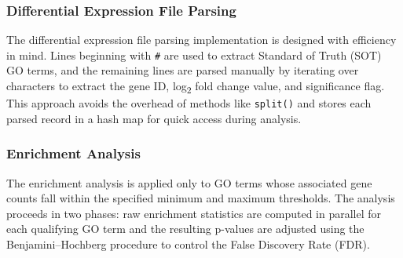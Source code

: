 \documentclass{article}
\begin{document}
    \subsubsection{Differential Expression File Parsing}\label{subsubsec:differential-expression-file-parsing}
    The differential expression file parsing implementation is designed with efficiency in mind. Lines beginning with \texttt{\#} are used to extract Standard of Truth (SOT) GO terms, and the remaining lines are parsed manually by iterating over characters to extract the gene ID, log\textsubscript{2} fold change value, and significance flag. This approach avoids the overhead of methods like \texttt{split()} and stores each parsed record in a hash map for quick access during analysis.

    \subsubsection{Enrichment Analysis}\label{subsubsec:enrichment-analysis}
    The enrichment analysis is applied only to GO terms whose associated gene counts fall within the specified minimum and maximum thresholds. The analysis proceeds in two phases: raw enrichment statistics are computed in parallel for each qualifying GO term and the resulting p-values are adjusted using the Benjamini–Hochberg procedure to control the False Discovery Rate (FDR).
\end{document}
